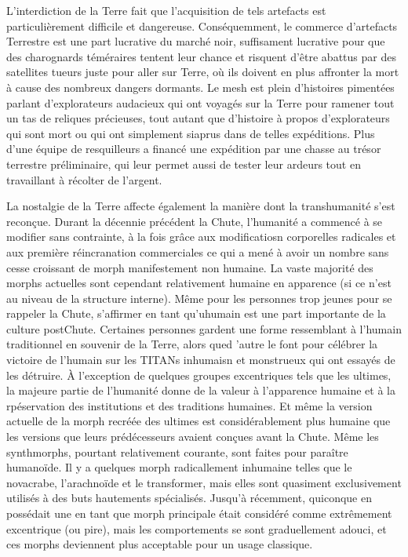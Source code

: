 L'interdiction de la Terre fait que l'acquisition de tels artefacts est particulièrement difficile et dangereuse. Conséquemment, le commerce d'artefacts Terrestre est une part lucrative du marché noir, suffisament lucrative pour que des charognards téméraires tentent leur chance et risquent d'être abattus par des satellites tueurs juste pour aller sur Terre, où ils doivent en plus affronter la mort à cause des nombreux dangers dormants. Le mesh est plein d'histoires pimentées parlant d'explorateurs audacieux qui ont voyagés sur la Terre pour ramener tout un tas de reliques précieuses, tout autant que d'histoire à propos d'explorateurs qui sont mort ou qui ont simplement siaprus dans de telles expéditions. Plus d'une équipe de resquilleurs a financé une expédition par une chasse au trésor terrestre préliminaire, qui leur permet aussi de tester leur ardeurs tout en travaillant à récolter de l'argent. 

La nostalgie de la Terre affecte également la manière dont la transhumanité s'est reconçue. Durant la décennie précédent la Chute, l'humanité a commencé à se modifier sans contrainte, à la fois grâce aux modificatiosn corporelles radicales et aux première réincranation commerciales ce qui a mené à avoir un nombre sans cesse croissant de morph manifestement non humaine. La vaste majorité des morphs actuelles sont cependant relativement humaine en apparence (si ce n'est au niveau de la structure interne). Même pour les personnes trop jeunes pour se rappeler la Chute, s'affirmer en tant qu'uhumain est une part importante de la culture postChute. Certaines personnes gardent une forme ressemblant à l'humain traditionnel en souvenir de la Terre, alors qued 'autre le font pour célébrer la victoire de l'humain sur les TITANs inhumaisn et monstrueux qui ont essayés de les détruire. À l'exception de quelques groupes excentriques tels que les ultimes, la majeure partie de l'humanité donne de la valeur à l'apparence humaine et à la rpéservation des institutions et des traditions humaines. Et même la version actuelle de la morph recréée des ultimes est considérablement plus humaine que les versions que leurs prédécesseurs avaient conçues avant la Chute. Même les synthmorphs, pourtant relativement courante, sont faites pour paraître humanoïde. Il y a quelques morph radicallement inhumaine telles que le novacrabe, l'arachnoïde et le transformer, mais elles sont quasiment exclusivement utilisés à des buts hautements spécialisés. Jusqu'à récemment, quiconque en possédait une en tant que morph principale était considéré comme extrêmement excentrique (ou pire), mais les comportements se sont graduellement adouci, et ces morphs deviennent plus acceptable pour un usage classique. 

